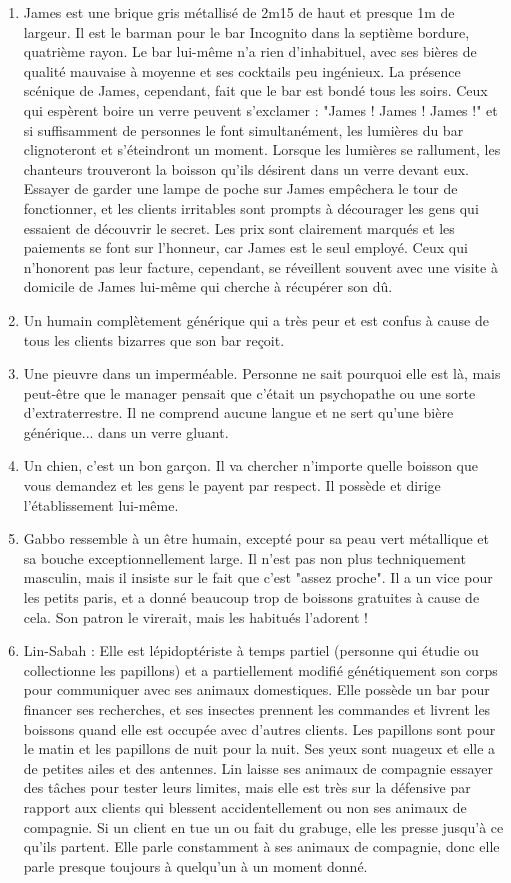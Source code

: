 \documentclass{article}
\begin{document}
\begin{enumerate}
	\item James est une brique gris métallisé de 2m15 de haut et presque 1m de largeur. Il est le barman pour le bar Incognito dans la septième bordure, quatrième rayon. Le bar lui-même n'a rien d'inhabituel, avec ses bières de qualité mauvaise à moyenne et ses cocktails peu ingénieux. La présence scénique de James, cependant, fait que le bar est bondé tous les soirs. Ceux qui espèrent boire un verre peuvent s'exclamer : "James ! James ! James !" et si suffisamment de personnes le font simultanément, les lumières du bar clignoteront et s'éteindront un moment. Lorsque les lumières se rallument, les chanteurs trouveront la boisson qu'ils désirent dans un verre devant eux. Essayer de garder une lampe de poche sur James empêchera le tour de fonctionner, et les clients irritables sont prompts à décourager les gens qui essaient de découvrir le secret. Les prix sont clairement marqués et les paiements se font sur l'honneur, car James est le seul employé. Ceux qui n’honorent pas leur facture, cependant, se réveillent souvent avec une visite à domicile de James lui-même qui cherche à récupérer son dû.
	\item Un humain complètement générique qui a très peur et est confus à cause de tous les clients bizarres que son bar reçoit.
	\item Une pieuvre dans un imperméable. Personne ne sait pourquoi elle est là, mais peut-être que le manager pensait que c'était un psychopathe ou une sorte d'extraterrestre. Il ne comprend aucune langue et ne sert qu'une bière générique... dans un verre gluant.
	\item Un chien, c'est un bon garçon. Il va chercher n'importe quelle boisson que vous demandez et les gens le payent par respect. Il possède et dirige l'établissement lui-même.
	\item Gabbo ressemble à un être humain, excepté pour sa peau vert métallique et sa bouche exceptionnellement large. Il n'est pas non plus techniquement masculin, mais il insiste sur le fait que c'est "assez proche". Il a un vice pour les petits paris, et a donné beaucoup trop de boissons gratuites à cause de cela. Son patron le virerait, mais les habitués l'adorent !
	\item Lin-Sabah : Elle est lépidoptériste à temps partiel (personne qui étudie ou collectionne les papillons) et a partiellement modifié génétiquement son corps pour communiquer avec ses animaux domestiques. Elle possède un bar pour financer ses recherches, et ses insectes prennent les commandes et livrent les boissons quand elle est occupée avec d'autres clients. Les papillons sont pour le matin et les papillons de nuit pour la nuit. Ses yeux sont nuageux et elle a de petites ailes et des antennes. Lin laisse ses animaux de compagnie essayer des tâches pour tester leurs limites, mais elle est très sur la défensive par rapport aux clients qui blessent accidentellement ou non ses animaux de compagnie. Si un client en tue un ou fait du grabuge, elle les presse jusqu'à ce qu'ils partent. Elle parle constamment à ses animaux de compagnie, donc elle parle presque toujours à quelqu'un à un moment donné.

\end{enumerate}
\end{document}
